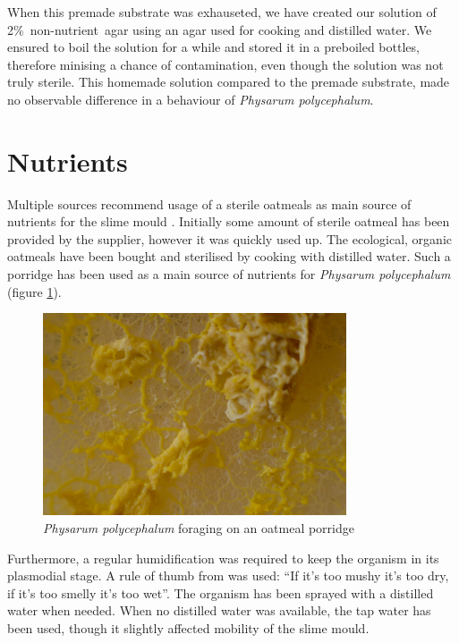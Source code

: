 \documentclass[english,a4paper,twoside]{ppfcmthesis}
\begin{document}
When this premade substrate was exhauseted, we have created our solution of 2\%~non-nutrient~agar using an agar used for cooking and distilled water. We ensured to boil the solution for a while and stored it in a preboiled bottles, therefore minising a chance of contamination, even though the solution was not truly sterile. This homemade solution compared to the premade substrate, made no observable difference in a behaviour of \textit{Physarum polycephalum}.


\section*{Nutrients}

Multiple sources recommend usage of a sterile oatmeals as main source of nutrients for the slime mould \cite{nakagaki2000intelligence,nakagaki2004obtaining,adamatzky2010physarum}. Initially some amount of sterile oatmeal has been provided by the supplier, however it was quickly used up. The ecological, organic oatmeals have been bought and sterilised by cooking with distilled water. Such a porridge has been used as a main source of nutrients for \textit{Physarum polycephalum} (figure \ref{figure:p_porridge}).

\begin{figure}
  \centering

  \includegraphics[width=0.8\textwidth]{figures/physarum/D8E_2184.jpg}

  \caption{\textit{Physarum polycephalum} foraging on an oatmeal porridge}
  \label{figure:p_porridge}
\end{figure}

Furthermore, a regular humidification was required to keep the organism in its plasmodial stage. A rule of thumb from \cite{adamatzky2010physarum} was used: ``If it's too mushy it's too dry, if it's too smelly it's too wet''. The organism has been sprayed with a distilled water when needed. When no distilled water was available, the tap water has been used, though it slightly affected mobility of the slime mould.
\end{document}
